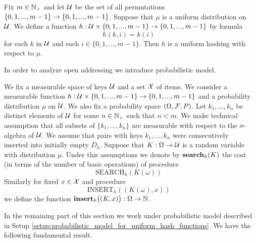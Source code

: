 \begin{example}\label{example:uniform_hashing_canonical_example}
Fix $m\in {\mathbb N}_+$ and let ${\mathcal U}$ be the set of all permutations $\{0,1,...,m-1\}\rightarrow \{0,1,...,m-1\}$. Suppose that $\mu$ is a uniform distribution on ${\mathcal U}$. We define a function $h:{\mathcal U}\times \{0,1,...,m-1\}\rightarrow \{0,1,...,m-1\}$ by formula
$$h(k,i) = k(i)$$
for each $k$ in ${\mathcal U}$ and each $i\in \{0,1,...,m-1\}$. Then $h$ is a uniform hashing with respect to $\mu$.
\end{example}
\noindent
In order to analyze open addressing we introduce probabilistic model.

\begin{setup}\label{setup:probabilistic_model_for_uniform_hash_functions}
We fix a measurable space of keys ${\mathcal U}$ and a set ${\mathcal X}$ of items. We consider a measurable function $h:{\mathcal U}\times \{0,1,...,m-1\} \rightarrow \{0,1,...,m-1\}$ and a probability distribution $\mu$ on ${\mathcal U}$. We also fix a probability space $(\Omega,{\mathcal F},P)$. Let $k_1,...,k_n$ be distinct elements of ${\mathcal U}$ for some $n\in {\mathbb N}_+$ such that $n < m$. We make technical assumption that all subsets of $\{k_1,...,k_n\}$ are measurable with respect to the $\sigma$-algebra of ${\mathcal U}$. We assume that pairs with keys $k_1,...,k_n$ were consecutively inserted into initially empty $D_h$. Suppose that $K:\Omega\rightarrow {\mathcal U}$ is a random variable with distribution $\mu$. Under this assumptions we denote by $\mathbf{search}_h(K)$ the cost (in terms of the number of basic operations) of procedure
$$\mathrm{SEARCH}_h(K(\omega))$$
Similarly for fixed $x\in {\mathcal X}$ and procedure
$$\mathrm{INSERT}_h\left((K(\omega),x)\right)$$
we define the function $\mathbf{insert}_h\big((K,x)\big):\Omega\rightarrow {\mathbb N}$.
\end{setup}
\noindent
In the remaining part of this section we work under probabilistic model described in Setup \ref{setup:probabilistic_model_for_uniform_hash_functions}. We have the following fundamental result.

